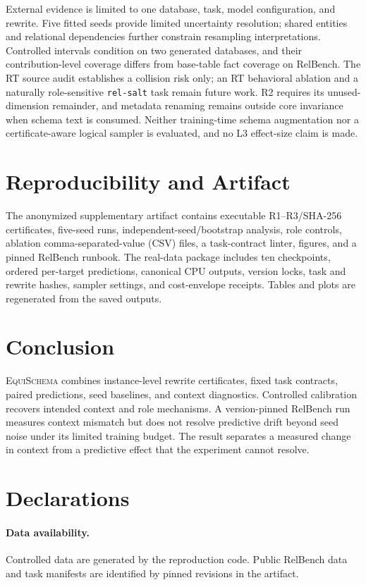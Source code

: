 \documentclass[runningheads]{llncs}
\newcommand{\method}{\textsc{EquiSchema}\xspace}
\begin{document}
External evidence is limited to one database, task, model configuration, and rewrite. Five fitted seeds provide limited uncertainty resolution; shared entities and relational dependencies further constrain resampling interpretations. Controlled intervals condition on two generated databases, and their contribution-level coverage differs from base-table fact coverage on RelBench. The RT source audit establishes a collision risk only; an RT behavioral ablation and a naturally role-sensitive \texttt{rel-salt} task remain future work. R2 requires its unused-dimension remainder, and metadata renaming remains outside core invariance when schema text is consumed. Neither training-time schema augmentation nor a certificate-aware logical sampler is evaluated, and no L3 effect-size claim is made.

\section{Reproducibility and Artifact}
The anonymized supplementary artifact contains executable R1--R3/SHA-256 certificates, five-seed runs, independent-seed/bootstrap analysis, role controls, ablation comma-separated-value (CSV) files, a task-contract linter, figures, and a pinned RelBench runbook. The real-data package includes ten checkpoints, ordered per-target predictions, canonical CPU outputs, version locks, task and rewrite hashes, sampler settings, and cost-envelope receipts. Tables and plots are regenerated from the saved outputs.

\section{Conclusion}
\method combines instance-level rewrite certificates, fixed task contracts, paired predictions, seed baselines, and context diagnostics. Controlled calibration recovers intended context and role mechanisms. A version-pinned RelBench run measures context mismatch but does not resolve predictive drift beyond seed noise under its limited training budget. The result separates a measured change in context from a predictive effect that the experiment cannot resolve.

\section*{Declarations}
\paragraph{Data availability.} Controlled data are generated by the reproduction code. Public RelBench data and task manifests are identified by pinned revisions in the artifact.
\end{document}

